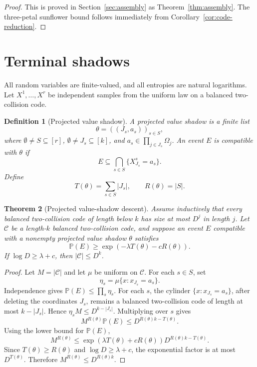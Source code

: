 \documentclass[11pt]{article}
\newtheorem{theorem}{Theorem}[section]
\newtheorem{definition}[theorem]{Definition}
\theoremstyle{remark}
\newcommand{\C}{\mathcal C}
\newcommand{\Prob}{\mathbb P}
\begin{document}
\begin{proof}
This is proved in Section~\ref{sec:assembly} as Theorem~\ref{thm:assembly}.  The three-petal sunflower bound follows immediately from Corollary~\ref{cor:code-reduction}.
\end{proof}

\section{Terminal shadows}

All random variables are finite-valued, and all entropies are natural logarithms.  Let $X^1,\ldots,X^r$ be independent samples from the uniform law on a balanced two-collision code.

\begin{definition}[Projected value shadow]
A projected value shadow is a finite list
\[
        \theta=((J_s,a_s))_{s\in S},
\]
where $\emptyset\ne S\subseteq [r]$, $\emptyset\ne J_s\subseteq [k]$, and $a_s\in\prod_{j\in J_s}\Omega_j$.  An event $E$ is compatible with $\theta$ if
\[
        E\subseteq \bigcap_{s\in S}\{X^s_{J_s}=a_s\}.
\]
Define
\[
        T(\theta)=\sum_{s\in S}|J_s|,\qquad R(\theta)=|S|.
\]
\end{definition}

\begin{theorem}[Projected value-shadow descent]\label{thm:value-shadow}
Assume inductively that every balanced two-collision code of length below $k$ has size at most $D^j$ in length $j$.  Let $\C$ be a length-$k$ balanced two-collision code, and suppose an event $E$ compatible with a nonempty projected value shadow $\theta$ satisfies
\[
        \Prob(E)\ge \exp(-\lambda T(\theta)-cR(\theta)).
\]
If $\log D\ge \lambda+c$, then $|\C|\le D^k$.
\end{theorem}

\begin{proof}
Let $M=|\C|$ and let $\mu$ be uniform on $\C$.  For each $s\in S$, set
\[
        \eta_s=\mu\{x:x_{J_s}=a_s\}.
\]
Independence gives $\Prob(E)\le\prod_s\eta_s$.  For each $s$, the cylinder $\{x:x_{J_s}=a_s\}$, after deleting the coordinates $J_s$, remains a balanced two-collision code of length at most $k-|J_s|$.  Hence $\eta_s M\le D^{k-|J_s|}$.  Multiplying over $s$ gives
\[
        M^{R(\theta)}\Prob(E)\le D^{R(\theta)k-T(\theta)}.
\]
Using the lower bound for $\Prob(E)$,
\[
        M^{R(\theta)}\le \exp(\lambda T(\theta)+cR(\theta))D^{R(\theta)k-T(\theta)}.
\]
Since $T(\theta)\ge R(\theta)$ and $\log D\ge \lambda+c$, the exponential factor is at most $D^{T(\theta)}$.  Therefore $M^{R(\theta)}\le D^{R(\theta)k}$.
\end{proof}
\end{document}
